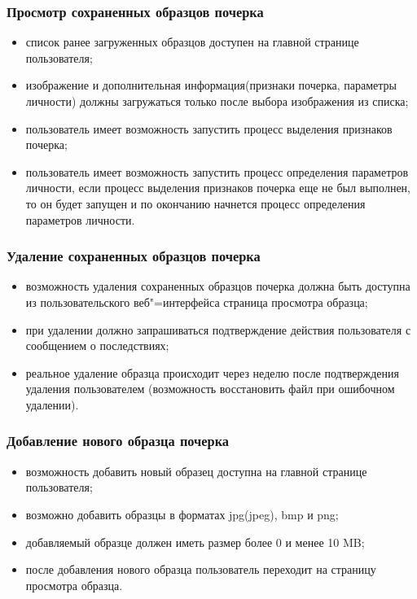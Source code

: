 \subsubsection{Просмотр сохраненных образцов почерка}
\label{sec:freq:show}
\begin{itemize}
	\item список ранее загруженных образцов доступен на главной странице пользователя;
	\item изображение и дополнительная информация(признаки почерка, параметры личности) должны загружаться только после выбора изображения из списка;
	\item пользователь имеет возможность запустить процесс выделения признаков почерка;
	\item пользователь имеет возможность запустить процесс определения параметров личности, если процесс выделения признаков почерка еще не был выполнен, то он будет запущен и по окончанию начнется процесс определения параметров личности.
\end{itemize}

\subsubsection{Удаление сохраненных образцов почерка}
\label{sec:freq:delete}
\begin{itemize}
	\item возможность удаления сохраненных образцов почерка должна быть доступна из пользовательского веб"=интерфейса страница просмотра образца;
	\item при удалении должно запрашиваться подтверждение действия пользователя с сообщением о последствиях;
	\item реальное удаление образца происходит через неделю после подтверждения удаления пользователем (возможность восстановить файл при ошибочном удалении).
\end{itemize}

\subsubsection{Добавление нового образца почерка}
\label{sec:freq:add}
\begin{itemize}
	\item возможность добавить новый образец доступна на главной странице пользователя;
	\item возможно добавить образцы в форматах jpg(jpeg), bmp и png;
	\item добавляемый образце должен иметь размер более 0 и менее 10 MB;
	\item после добавления нового образца пользователь переходит на страницу просмотра образца.
\end{itemize}

